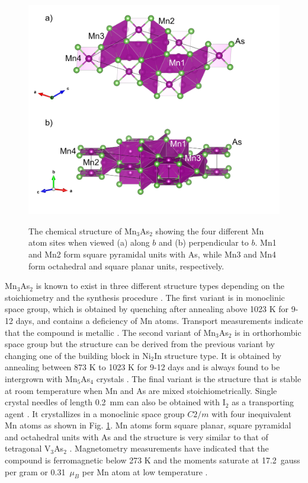 \documentclass[10pt,doublespacing,edeposit]{uiucthesis2020}
\begin{document}
\begin{mainmatter}
\begin{figure}
\centering\includegraphics[width=0.8\columnwidth]{figures/ch6/monoclinic_Mn3As2_75510.png} \\
\caption{The chemical structure of Mn$_3$As$_2$ showing the four different Mn atom sites when viewed (a) along $b$ and (b) perpendicular to $b$. Mn1 and Mn2 form square pyramidal units with As, while Mn3 and Mn4 form octahedral and square planar units, respectively.
}
\label{fig:Mn3As2_crystal_structure}
\end{figure}


Mn$_3$As$_2$ is known to exist in three different structure types depending on the stoichiometry and the synthesis procedure \cite{Dietrich1990,Moller1993,Hagedorn1994}. The first variant is in monoclinic space group, which is obtained by quenching after annealing above 1023 K for 9-12 days, and contains a deficiency of Mn atoms. Transport measurements indicate that the compound is metallic \cite{Dietrich1990}. The second variant of Mn$_3$As$_2$ is in orthorhombic space group but the structure can be derived from the previous variant by changing one of the building block in Ni$_2$In structure type.
It is obtained by annealing between 873 K to 1023 K for 9-12 days and is always found to be intergrown with Mn$_5$As$_4$ crystals \cite{Moller1993}. The final variant is the structure that is stable at room temperature when Mn and As are mixed stoichiometrically. 
Single crystal needles of length 0.2~mm can also be obtained with I$_2$ as a transporting agent \cite{Hagedorn1994}.
It crystallizes in a monoclinic space group $C2/m$ with four inequivalent Mn atoms as shown in Fig. \ref{fig:Mn3As2_crystal_structure}. Mn atoms form square planar, square pyramidal and octahedral units with As and the structure is very similar to that of tetragonal V$_3$As$_2$ \cite{Hagedorn1994,Hagedorn1995}. Magnetometry measurements have indicated that the compound is ferromagnetic below 273 K and the moments saturate at 17.2~gauss per gram or 0.31~$\mu_B$ per Mn atom at low temperature \cite{Yuzuri1960}. 



\end{mainmatter}
\end{document}
